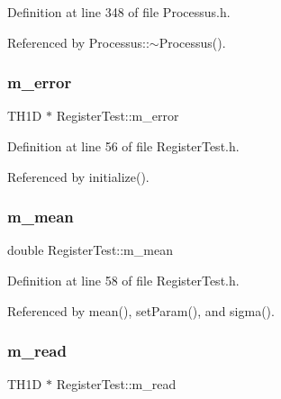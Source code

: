 Definition at line 348 of file Processus.\+h.



Referenced by Processus\+::$\sim$\+Processus().

\mbox{\label{classRegisterTest_a9b32a49463a1b1d319fde007607254f0}} 
\subsubsection{\texorpdfstring{m\+\_\+error}{m\_error}}
{\footnotesize\ttfamily T\+H1D $\ast$ Register\+Test\+::m\+\_\+error\hspace{0.3cm}{\ttfamily [private]}}



Definition at line 56 of file Register\+Test.\+h.



Referenced by initialize().

\mbox{\label{classRegisterTest_aba5ac8088017236617d2244fc0c261b9}} 
\subsubsection{\texorpdfstring{m\+\_\+mean}{m\_mean}}
{\footnotesize\ttfamily double Register\+Test\+::m\+\_\+mean\hspace{0.3cm}{\ttfamily [private]}}



Definition at line 58 of file Register\+Test.\+h.



Referenced by mean(), set\+Param(), and sigma().

\mbox{\label{classRegisterTest_a5bb74853c26fdf7223244c569c64eb6d}} 
\subsubsection{\texorpdfstring{m\+\_\+read}{m\_read}}
{\footnotesize\ttfamily T\+H1D $\ast$ Register\+Test\+::m\+\_\+read\hspace{0.3cm}{\ttfamily [private]}}



